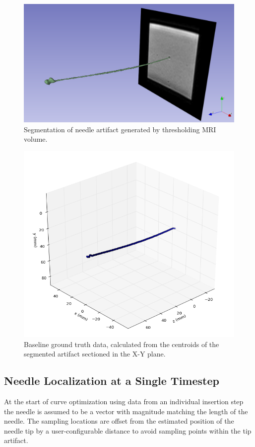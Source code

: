 \begin{figure}[h]
\includegraphics[width=1.0\textwidth]{Fig/chap5/segmented_artifact_2001.png}
\caption{Segmentation of needle artifact generated by thresholding MRI volume.}
\label{fig:seg_2001}
\end{figure}

\begin{figure}[h]
\includegraphics[width=1.0\textwidth]{Fig/chap5/neutral_axis_2001_b.png}
\caption{Baseline ground truth data, calculated from the centroids of the segmented artifact sectioned in the X-Y plane.}
\label{fig:ground_truth_2001}
\end{figure}

\subsection{Needle Localization at a Single Timestep}
\label{sec:mri_single_timestep}
At the start of curve optimization using data from an individual insertion step the needle is assumed to be a vector with magnitude matching the length of the needle. The sampling locations are offset from the estimated position of the needle tip by a user-configurable distance to avoid sampling points within the tip artifact.


